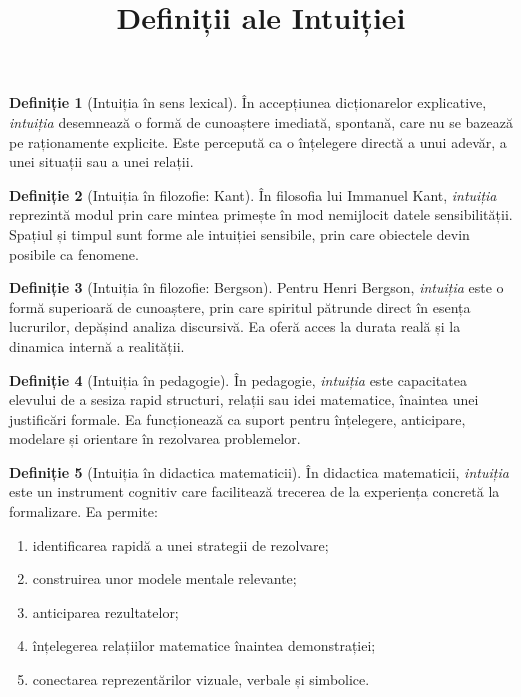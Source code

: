 \documentclass[12pt]{article}
\title{Definiții ale Intuiției}
\author{}
\date{}
\theoremstyle{definition}
\newtheorem{definition}{Definiție}
\begin{document}
\maketitle

\begin{definition}[Intuiția în sens lexical]
În accepțiunea dicționarelor explicative, \emph{intuiția} desemnează o formă de cunoaștere imediată, spontană, care nu se bazează pe raționamente explicite. Este percepută ca o înțelegere directă a unui adevăr, a unei situații sau a unei relații.
\end{definition}

\begin{definition}[Intuiția în filozofie: Kant]
În filosofia lui Immanuel Kant, \emph{intuiția} reprezintă modul prin care mintea primește în mod nemijlocit datele sensibilității. Spațiul și timpul sunt forme ale intuiției sensibile, prin care obiectele devin posibile ca fenomene.
\end{definition}

\begin{definition}[Intuiția în filozofie: Bergson]
Pentru Henri Bergson, \emph{intuiția} este o formă superioară de cunoaștere, prin care spiritul pătrunde direct în esența lucrurilor, depășind analiza discursivă. Ea oferă acces la durata reală și la dinamica internă a realității.
\end{definition}

\begin{definition}[Intuiția în pedagogie]
În pedagogie, \emph{intuiția} este capacitatea elevului de a sesiza rapid structuri, relații sau idei matematice, înaintea unei justificări formale. Ea funcționează ca suport pentru înțelegere, anticipare, modelare și orientare în rezolvarea problemelor.
\end{definition}

\begin{definition}[Intuiția în didactica matematicii]
În didactica matematicii, \emph{intuiția} este un instrument cognitiv care facilitează trecerea de la experiența concretă la formalizare. Ea permite:
\begin{enumerate}
    \item identificarea rapidă a unei strategii de rezolvare;
    \item construirea unor modele mentale relevante;
    \item anticiparea rezultatelor;
    \item înțelegerea relațiilor matematice înaintea demonstrației;
    \item conectarea reprezentărilor vizuale, verbale și simbolice.
\end{enumerate}
\end{definition}
\end{document}
